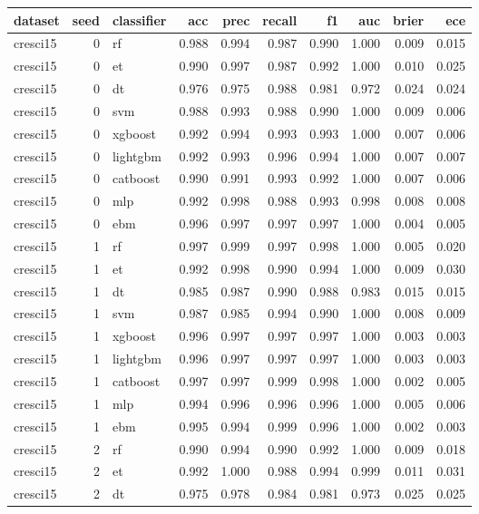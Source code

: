 \begin{tabular}{lrlrrrrrrr}
\toprule
dataset & seed & classifier & acc & prec & recall & f1 & auc & brier & ece \\
\midrule
cresci15 & 0 & rf & 0.988 & 0.994 & 0.987 & 0.990 & 1.000 & 0.009 & 0.015 \\
cresci15 & 0 & et & 0.990 & 0.997 & 0.987 & 0.992 & 1.000 & 0.010 & 0.025 \\
cresci15 & 0 & dt & 0.976 & 0.975 & 0.988 & 0.981 & 0.972 & 0.024 & 0.024 \\
cresci15 & 0 & svm & 0.988 & 0.993 & 0.988 & 0.990 & 1.000 & 0.009 & 0.006 \\
cresci15 & 0 & xgboost & 0.992 & 0.994 & 0.993 & 0.993 & 1.000 & 0.007 & 0.006 \\
cresci15 & 0 & lightgbm & 0.992 & 0.993 & 0.996 & 0.994 & 1.000 & 0.007 & 0.007 \\
cresci15 & 0 & catboost & 0.990 & 0.991 & 0.993 & 0.992 & 1.000 & 0.007 & 0.006 \\
cresci15 & 0 & mlp & 0.992 & 0.998 & 0.988 & 0.993 & 0.998 & 0.008 & 0.008 \\
cresci15 & 0 & ebm & 0.996 & 0.997 & 0.997 & 0.997 & 1.000 & 0.004 & 0.005 \\
cresci15 & 1 & rf & 0.997 & 0.999 & 0.997 & 0.998 & 1.000 & 0.005 & 0.020 \\
cresci15 & 1 & et & 0.992 & 0.998 & 0.990 & 0.994 & 1.000 & 0.009 & 0.030 \\
cresci15 & 1 & dt & 0.985 & 0.987 & 0.990 & 0.988 & 0.983 & 0.015 & 0.015 \\
cresci15 & 1 & svm & 0.987 & 0.985 & 0.994 & 0.990 & 1.000 & 0.008 & 0.009 \\
cresci15 & 1 & xgboost & 0.996 & 0.997 & 0.997 & 0.997 & 1.000 & 0.003 & 0.003 \\
cresci15 & 1 & lightgbm & 0.996 & 0.997 & 0.997 & 0.997 & 1.000 & 0.003 & 0.003 \\
cresci15 & 1 & catboost & 0.997 & 0.997 & 0.999 & 0.998 & 1.000 & 0.002 & 0.005 \\
cresci15 & 1 & mlp & 0.994 & 0.996 & 0.996 & 0.996 & 1.000 & 0.005 & 0.006 \\
cresci15 & 1 & ebm & 0.995 & 0.994 & 0.999 & 0.996 & 1.000 & 0.002 & 0.003 \\
cresci15 & 2 & rf & 0.990 & 0.994 & 0.990 & 0.992 & 1.000 & 0.009 & 0.018 \\
cresci15 & 2 & et & 0.992 & 1.000 & 0.988 & 0.994 & 0.999 & 0.011 & 0.031 \\
cresci15 & 2 & dt & 0.975 & 0.978 & 0.984 & 0.981 & 0.973 & 0.025 & 0.025 \\

\end{tabular}
